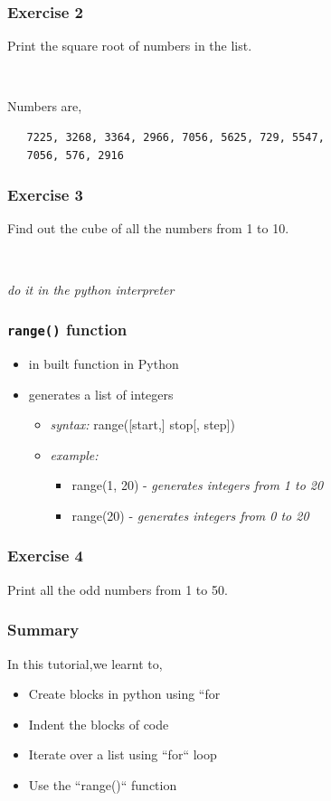 \documentclass[presentation]{beamer}
\begin{document}
\begin{frame}[fragile]
\frametitle{Exercise 2}
\label{sec-8}

  Print the square root of numbers in the list.
\begin{verbatim}
   
\end{verbatim}

  Numbers are,
\begin{verbatim}
   7225, 3268, 3364, 2966, 7056, 5625, 729, 5547, 
   7056, 576, 2916
\end{verbatim}
\end{frame}
\begin{frame}[fragile]
\frametitle{Exercise 3}
\label{sec-9}

  Find out the cube of all the numbers from 1 to 10.
\begin{verbatim}
   
\end{verbatim}

  \emph{do it in the python interpreter}
\end{frame}
\begin{frame}
\frametitle{\verb~range()~ function}
\label{sec-10}


\begin{itemize}
\item in built function in Python
\item generates a list of integers
\begin{itemize}
\item \emph{syntax:} range([start,] stop[, step])
\item \emph{example:}
\begin{itemize}
\item range(1, 20) - \emph{generates integers from 1 to 20}
\item range(20) - \emph{generates integers from 0 to 20}
\end{itemize}
\end{itemize}
\end{itemize}
\end{frame}
\begin{frame}
\frametitle{Exercise 4}
\label{sec-11}

  Print all the odd numbers from 1 to 50.
\end{frame}
\begin{frame}
\frametitle{Summary}
\label{sec-12}

  In this tutorial,we learnt to,

\begin{itemize}
\item Create blocks in python using ``for
\item Indent the blocks of code
\item Iterate over a list using ``for`` loop
\item Use the ``range()`` function
\end{itemize}
\end{frame}
\end{document}
